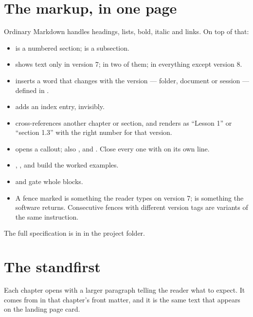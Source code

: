 \documentclass{symbulator}
\begin{document}
\section{The markup, in one page}

Ordinary Markdown handles headings, lists, bold, italic and links. On top of
that:

\begin{itemize}
\item {} is a numbered section;  is a
      subsection.
\item {} shows text only in version 7;
       in two of them;  in
      everything except version 8.
\item {} inserts a word that changes with the version
      --- folder, document or session --- defined in .
\item {} adds an index entry, invisibly.
\item {} cross-references another chapter or
      section, and renders as ``Lesson 1'' or ``section 1.3'' with the right
      number for that version.
\item {} opens a callout; also ,
       and . Close every one with
      \symcode{:::} on its own line.
\item {}, ,  and
       build the worked examples.
\item {} and  gate whole blocks.
\item A fence marked  is something the reader types on version 7;
       is something the software returns. Consecutive fences with
      different version tags are variants of the same instruction.
\end{itemize}

The full specification is in  in the project folder.

\section{The standfirst}

Each chapter opens with a larger paragraph telling the reader what to expect.
It comes from  in that chapter's front matter, and it is the
same text that appears on the landing page card.
\end{document}
